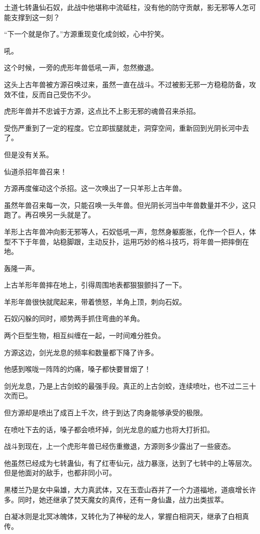 \begin{this_body}
土道七转蛊仙石奴，此战中他堪称中流砥柱，没有他的防守贡献，影无邪等人怎可能支撑到这一刻？

“下一个就是你了。”方源重现变化成剑蛟，心中狞笑。

吼。

这个时候，一旁的虎形年兽低吼一声，忽然撤退。

这头上古年兽被方源召唤过来，虽然一直在战斗。不过被影无邪一方稳稳防备，攻效不佳，反而自己受伤不少。

虎形年兽并不忠诚于方源，这点比不上影无邪的魂兽召来杀招。

受伤严重到了一定的程度。它立即拔腿就走，洞穿空间，重新回到光阴长河中去了。

但是没有关系。

仙道杀招年兽召来！

方源再度催动这个杀招。这一次唤出了一只羊形上古年兽。

虽然年兽召来每一次，只能召唤一头年兽。但光阴长河当中年兽数量并不少，这只跑了。再召唤另一头就是了。

羊形上古年兽冲向影无邪等人，石奴低吼一声，忽然身躯膨胀，化作一个巨人，体型不下于年兽，站稳脚跟，主动反扑，运用巧妙的格斗技巧，将年兽一把摔倒在地。

轰隆一声。

上古羊形年兽摔在地上，引得周围地表都狠狠颤抖了一下。

羊形年兽很快就爬起来，带着愤怒，羊角上顶，刺向石奴。

石奴闪躲的同时，顺势两手抓住弯曲的羊角。

两个巨型生物，相互纠缠在一起，一时间难分胜负。

方源这边，剑光龙息的频率和数量都下降了许多。

他感到喉咙一阵阵的灼痛，嗓子都快要冒烟了！

剑光龙息，乃是上古剑蛟的最强手段。真正的上古剑蛟，连续喷吐，也不过二三十次而已。

但方源却是喷出了成百上千次，终于到达了肉身能够承受的极限。

在喷吐下去的话，嗓子都会喷坏掉，剑光龙息的威力也将大打折扣。

战斗到现在，上一个虎形年兽已经伤重撤退，方源则多少露出了一些疲态。

他虽然已经成为七转蛊仙，有了红枣仙元，战力暴涨，达到了七转中的上等层次。但是他面对的敌手，也都非同小可。

黑楼兰乃是女中枭雄，大力真武体，又在玉壶山吞并了一个力道福地，道痕增长许多。同时，她还继承了焚天魔女的真传，还有一身仙蛊，战力出类拔萃。

白凝冰则是北冥冰魄体，又转化为了神秘的龙人，掌握白相洞天，继承了白相真传。


\end{this_body}
